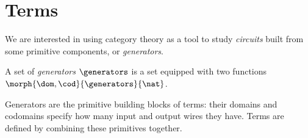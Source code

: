 \section{Terms}

We are interested in using category theory as a tool to study \emph{circuits}
built from some primitive components, or \emph{generators}.

\begin{definition}[Generators]\label{def:generators}
    A set of \emph{generators} \(\generators\) is a set equipped with two
    functions \(\morph{\dom,\cod}{\generators}{\nat}\).
\end{definition}

Generators are the primitive building blocks of terms: their domains and
codomains specify how many input and output wires they have.
Terms are defined by combining these primitives together.

